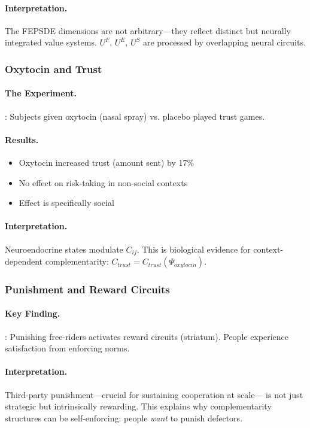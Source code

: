 \documentclass[12pt,a4paper]{article}
\begin{document}
\paragraph{Interpretation.}
The FEPSDE dimensions are not arbitrary---they reflect distinct
but neurally integrated value systems. $U^F$, $U^E$, $U^S$ are
processed by overlapping neural circuits.

\subsubsection{Oxytocin and Trust}

\paragraph{The Experiment.}
\citet{kosfeld2005}: Subjects given oxytocin (nasal spray) vs. placebo
played trust games.

\paragraph{Results.}
\begin{itemize}
  \item Oxytocin increased trust (amount sent) by 17\%
  \item No effect on risk-taking in non-social contexts
  \item Effect is specifically social
\end{itemize}

\paragraph{Interpretation.}
Neuroendocrine states modulate $C_{ij}$.
This is biological evidence for context-dependent complementarity:
$C_{trust} = C_{trust}(\Psi_{oxytocin})$.

\subsubsection{Punishment and Reward Circuits}

\paragraph{Key Finding.}
\citet{dequervain2004}: Punishing free-riders activates reward circuits (striatum).
People experience satisfaction from enforcing norms.

\paragraph{Interpretation.}
Third-party punishment---crucial for sustaining cooperation at scale---
is not just strategic but intrinsically rewarding.
This explains why complementarity structures can be self-enforcing:
people \emph{want} to punish defectors.
\end{document}
